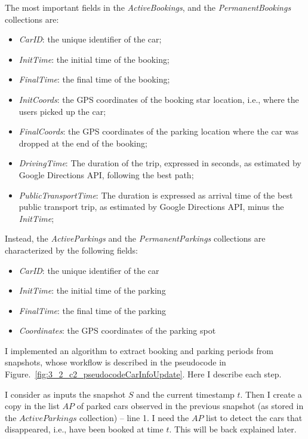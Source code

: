 The most important fields in the \textit{ActiveBookings}, and the \textit{PermanentBookings} collections are:
\begin{itemize}
\setlength\itemsep{0.1em}
\item \textit{CarID}: the unique identifier of the car;
\item \textit{InitTime}: the initial time of the booking;
\item \textit{FinalTime}:  the final time of the booking;
\item \textit{InitCoords}:  the GPS coordinates of the booking star location, i.e., where the users picked up the car;
\item \textit{FinalCoords}:  the GPS coordinates of the parking location where the car was dropped at the end of the booking;
\item \textit{DrivingTime}: The duration of the trip, expressed in seconds, as estimated by Google Directions API, following the best path;
\item \textit{PublicTransportTime}: The duration is expressed as arrival time of the best public transport trip, as estimated by Google Directions API, minus the \textit{InitTime};
\end{itemize}

Instead, the \textit{ActiveParkings} and the \textit{PermanentParkings} collections are characterized by the following fields:
\begin{itemize}
\setlength\itemsep{0.1em}
\item \textit{CarID}: the unique identifier of the car
\item \textit{InitTime}: the initial time of the parking
\item \textit{FinalTime}:  the final time of the parking
\item \textit{Coordinates}: the GPS coordinates of the parking spot 
\end{itemize}




I implemented an algorithm to extract booking and parking periods from snapshots, whose workflow is described in the pseudocode in Figure.~\ref{fig:3_2_c2_pseudocodeCarInfoUpdate}. Here I describe each  step.

I consider as inputs the snapshot $S$ and the current timestamp $t$.
Then I create a copy in the list $AP$ of parked cars observed in the previous snapshot (as stored in the $ActiveParkings$ collection) -- line 1. I need the $AP$ list to detect the cars that disappeared, i.e., have been booked at time $t$. This will be back explained later.

